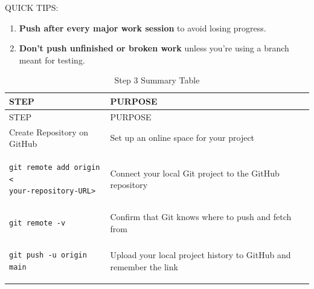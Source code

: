\documentclass[
  11pt,
  a4paper,
]{article}
\begin{document}
QUICK TIPS:

\begin{enumerate}
\def\labelenumi{\arabic{enumi}.}
\item
  \textbf{Push after every major work session} to avoid losing progress.
\item
  \textbf{Don't push unfinished or broken work} unless you're using a
  branch meant for testing.\\
\end{enumerate}

\begin{longtable}[]{@{}
  >{\raggedright\arraybackslash}p{}
  >{\raggedright\arraybackslash}p{}@{}}
\caption{Step 3 \textbar{} Summary Table}\tabularnewline
\toprule\noalign{}
\begin{minipage}[b]{\linewidth}\raggedright
STEP
\end{minipage} & \begin{minipage}[b]{\linewidth}\raggedright
PURPOSE
\end{minipage} \\
\midrule\noalign{}
\endfirsthead
\toprule\noalign{}
\begin{minipage}[b]{\linewidth}\raggedright
STEP
\end{minipage} & \begin{minipage}[b]{\linewidth}\raggedright
PURPOSE
\end{minipage} \\
\midrule\noalign{}
\endhead
\bottomrule\noalign{}
\endlastfoot
Create Repository on GitHub & Set up an online space for your project \\
\begin{minipage}[t]{\linewidth}\raggedright
\begin{verbatim}
git remote add origin <
your-repository-URL>
\end{verbatim}
\end{minipage} & Connect your local Git project to the GitHub
repository \\
\begin{minipage}[t]{\linewidth}\raggedright
\begin{verbatim}
git remote -v
\end{verbatim}
\end{minipage} & Confirm that Git knows where to push and fetch from \\
\begin{minipage}[t]{\linewidth}\raggedright
\begin{verbatim}
git push -u origin main
\end{verbatim}
\end{minipage} & Upload your local project history to GitHub and
remember the link \\
\end{longtable}
\end{document}
